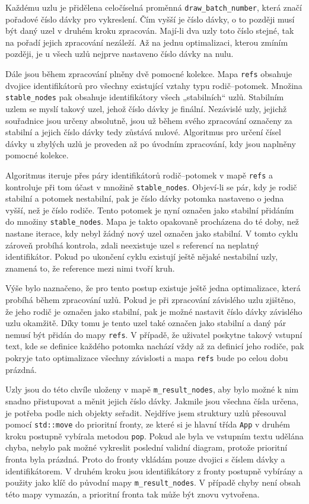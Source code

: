 \documentclass[FM,DP]{tulthesis}
\begin{document}
	Každému uzlu je přidělena celočíselná proměnná \texttt{draw\_batch\_number}, která značí pořadové číslo dávky pro vykreslení. Čím vyšší je číslo dávky, o to později musí být daný uzel v druhém kroku zpracován. Mají-li dva uzly toto číslo stejné, tak na pořadí jejich zpracování nezáleží.  Až na jednu optimalizaci, kterou zmíním později, je u všech uzlů nejprve nastaveno číslo dávky na nulu.
	
	Dále jsou během zpracování plněny dvě pomocné kolekce. Mapa \texttt{refs} obsahuje dvojice identifikátorů pro všechny existující vztahy typu rodič–potomek. Množina \texttt{stable\_nodes} pak obsahuje identifikátory všech „stabilních“ uzlů. Stabilním uzlem se myslí takový uzel, jehož číslo dávky je finální. Nezávislé uzly, jejichž souřadnice jsou určeny absolutně, jsou už během svého zpracování označeny za stabilní a jejich číslo dávky tedy zůstává nulové. Algoritmus pro určení čísel dávky u zbylých uzlů je proveden až po úvodním zpracování, kdy jsou naplněny pomocné kolekce.
	
	Algoritmus iteruje přes páry identifikátorů rodič–potomek v mapě \texttt{refs} a kontroluje při tom účast v množině \texttt{stable\_nodes}. Objeví-li se pár, kdy je rodič stabilní a potomek nestabilní, pak je číslo dávky potomka nastaveno o jedna vyšší, než je číslo rodiče. Tento potomek je nyní označen jako stabilní přidáním do množiny \texttt{stable\_nodes}. Mapa je takto opakovaně procházena do té doby, než nastane iterace, kdy nebyl žádný nový uzel označen jako stabilní. V tomto cyklu zároveň probíhá kontrola, zdali neexistuje uzel s referencí na neplatný identifikátor. Pokud po ukončení cyklu existují ještě nějaké nestabilní uzly, znamená to, že reference mezi nimi tvoří kruh.
	
	Výše bylo naznačeno, že pro tento postup existuje ještě jedna optimalizace, která probíhá během zpracování uzlů. Pokud je při zpracování závislého uzlu zjištěno, že jeho rodič je označen jako stabilní, pak je možné nastavit číslo dávky závislého uzlu okamžitě. Díky tomu je tento uzel také označen jako stabilní a daný pár nemusí být přidán do mapy \texttt{refs}. V případě, že uživatel poskytne takový vstupní text, kde se definice každého potomka nachází vždy až za definicí jeho rodiče, pak pokryje tato optimalizace všechny závislosti a mapa \texttt{refs} bude po celou dobu prázdná.
	
	Uzly jsou do této chvíle uloženy v mapě \texttt{m\_result\_nodes}, aby bylo možné k nim snadno přistupovat a měnit jejich číslo dávky. Jakmile jsou všechna čísla určena, je potřeba podle nich objekty seřadit. Nejdříve jsem struktury uzlů přesouval pomocí \texttt{std::move} do prioritní fronty, ze které si je hlavní třída \texttt{App} v druhém kroku postupně vybírala metodou \texttt{pop}. Pokud ale byla ve vstupním textu udělána chyba, nebylo pak možné vykreslit poslední validní diagram, protože prioritní fronta byla prázdná. Proto do fronty vkládám pouze dvojici s číslem dávky a identifikátorem. V druhém kroku jsou identifikátory z fronty postupně vybírány a použity jako klíč do původní mapy \texttt{m\_result\_nodes}. V případě chyby není obsah této mapy vymazán, a prioritní fronta tak může být znovu vytvořena.
	
\end{document}
